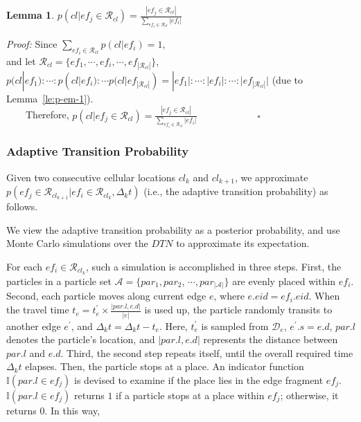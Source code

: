 \documentclass{vldb}
\newtheorem{lemma}{Lemma}
\begin{document}
	\begin{lemma}
		\label{le:p-em-2}
		$p(cl|ef_j\in \mathcal{R}_{cl})=\frac{|ef_{j}\in\mathcal{R}_{cl}|}{\sum_{ef_i\in \mathcal{R}_{cl}}|ef_i|}$
	\end{lemma}
	
	\textit{Proof: }
	Since $\sum_{ef_i\in \mathcal{R}_{cl}} p(cl|ef_i)=1$, \\
	and let $\mathcal{R}_{cl}=\{ef_1,\cdots,ef_i,\cdots,ef_{|\mathcal{R}_{cl}|}\}$, \\
	$p(cl|ef_1):\cdots :p(cl|ef_i): \cdots p(cl|ef_{|\mathcal{R}_{cl}|}) =|ef_1|:\cdots :|ef_i|:\cdots :|ef_{|\mathcal{R}_{cl}|}|$ (due to Lemma~\ref{le:p-em-1}).\\
	~~~~Therefore, $p(cl|ef_j\in \mathcal{R}_{cl})=\frac{|ef_{j}\in \mathcal{R}_{cl}|}{\sum_{ef_i\in \mathcal{R}_{cl}}|ef_i|}~~~~~~~~~~~~~~~~~~~~~~~~~~~~\square$
		
	\subsubsection{Adaptive Transition Probability}
	\label{sub-sec:hsmm}
	
	Given two consecutive cellular locations $cl_k$ and $cl_{k+1}$, we  approximate 
	$p(ef_{j}\in\mathcal{R}_{cl_{k+1}}|ef_i\in\mathcal{R}_{cl_k},\Delta_k t)$  
	(i.e., the adaptive transition probability) as follows.
	
	We view the adaptive transition probability as a posterior probability, and use Monte Carlo simulations over the $DTN$ to approximate its expectation.
	
	
	For each $ef_i\in\mathcal{R}_{cl_k}$, such a simulation is accomplished in three steps.
	First, the particles in a particle set  $\mathcal{A}=\{par_1, par_2$, $\cdots, par_{|\mathcal{A}|}\}$ are evenly placed within $ef_i$.
	Second, each particle moves along current edge $e$, where $e.eid=ef_i.eid$. 
	When the travel time $t_e=t^\prime_e\times\frac{|par.l,e.d|}{|e|} $ is used up, the particle randomly transits to another edge $e^\prime$, and $\Delta_k t=\Delta_k t-t_e$.
	Here, $t^\prime_e$ is sampled from $\mathcal{D}_e$, $e^\prime.s=e.d$, $par.l$ denotes the particle's location, and $|par.l,e.d|$ represents the distance between $par.l$ and $e.d$.
	Third, the second step repeats itself, until the overall required time $\Delta_k t$ elapses. 
	Then, the particle stops at a place.
	An indicator function $\mathbb{I}(par.l\in ef_{j})$ is devised to examine if the place lies in the edge fragment $ef_{j}$.
	$\mathbb{I}(par.l\in ef_{j})$ returns $1$  if a particle stops at a place within $ef_{j}$; otherwise, it returns $0$.
	In this way, %
	
\end{document}
